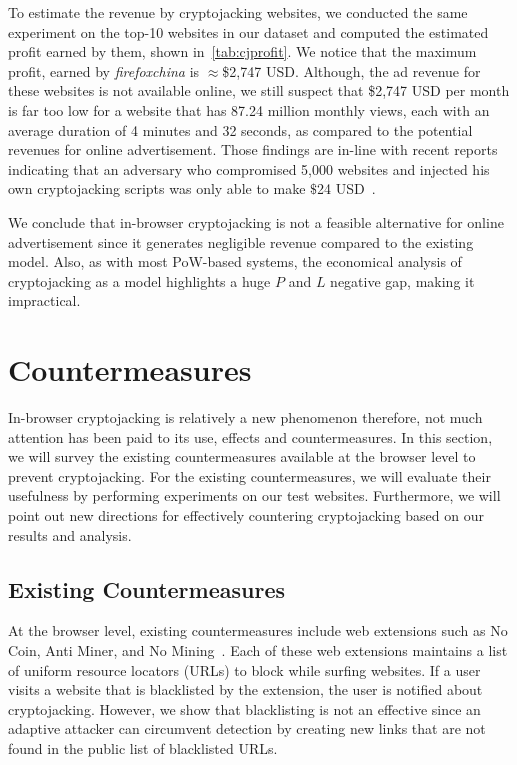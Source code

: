\documentclass[acmlarge]{acmart}
\newcommand{\cj}{cryptojacking\xspace}
\begin{document}
To estimate the revenue by \cj websites, we conducted the same experiment on the top-10 websites in our dataset and computed the estimated profit earned by them, shown in~\autoref{tab:cjprofit}. We notice that the maximum profit, earned by \textit{firefoxchina} is $\approx$\$2,747 USD. Although, the ad revenue for these websites is not available online, we still suspect that \$2,747 USD per month is far too low for a website that has 87.24 million monthly views, each with an average duration of 4 minutes and 32 seconds, as compared to the potential revenues for online advertisement. Those findings are in-line with recent reports indicating that an adversary who compromised 5,000 websites and injected his own \cj scripts was only able to make $\$$24 USD~\cite{Hern_18}. 


We conclude that in-browser \cj is not a feasible alternative for online advertisement since it generates negligible revenue compared to the existing model. Also, as with most PoW-based systems, the economical analysis of \cj as a model highlights a huge $P$ and $L$ negative gap, making it impractical.


\section{Countermeasures} \label{sec:counter}
In-browser \cj is relatively a new phenomenon therefore, not  much attention has been paid to its use, effects and countermeasures. In this section, we will survey the existing countermeasures available at the browser level to prevent \cj. For the existing countermeasures, we will evaluate their usefulness by performing experiments on our test websites. Furthermore, we will point out new directions for effectively countering \cj based on our results and analysis. 

\subsection{Existing Countermeasures} \label{sec:excm}
At the browser level, existing countermeasures include web extensions such as No Coin, Anti Miner, and No Mining~\cite{Keramidas_18,Tunghobrens-18,Nomining-18}. Each of these web extensions maintains a list of uniform resource locators (URLs) to block while surfing websites. If a user visits a website that is blacklisted by the extension, the user is notified about \cj. However, we show that blacklisting is not an effective since an adaptive attacker can circumvent detection by creating new links that are not found in the public list of blacklisted URLs.
\end{document}
